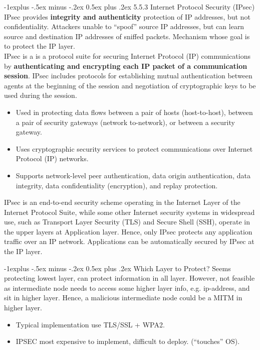 \documentclass[10pt, landscape]{article}
\makeatletter
\renewcommand{\subsection}{\@startsection{subsection}{2}{0mm}%
                                {-1explus -.5ex minus -.2ex}%
                                {0.5ex plus .2ex}%
                                {\normalfont\normalsize\bfseries}}
\makeatother
\begin{document}
\begin{multicols*}{3}
\subsection{5.5.3 Internet Protocol Security (IPsec)}
IPsec provides \textbf{integrity and authenticity} protection of IP addresses, but not confidentiality. Attackers unable to “spoof” source IP 
addresses, but can learn source and destination IP addresses of sniffed packets. Mechanism whose goal is to protect the IP layer. \\ \smallskip
IPsec is a is a protocol suite for securing Internet Protocol (IP) communications by \textbf{authenticating and encrypting each IP packet of a communication session}. IPsec includes protocols for establishing mutual authentication between agents at the beginning of the session and negotiation of cryptographic keys to be used during the session. 

\begin{itemize}
\item Used in protecting data flows between a pair of hosts (host-to-host), between a pair of security gateways (network to-network), or between a security gateway.
\item Uses cryptographic security services to protect communications over Internet Protocol (IP) networks.
\item Supports network-level peer authentication, data origin authentication, data integrity, data confidentiality (encryption), and 
replay protection. 
\end{itemize}
IPsec is an end-to-end security scheme operating in the Internet Layer of the Internet Protocol Suite, while some other Internet security systems in widespread use, such as Transport Layer Security (TLS) and Secure Shell (SSH), operate in the upper layers at
Application layer. Hence, only IPsec protects any application traffic over an IP network. Applications can be automatically secured by IPsec at the IP layer.

\subsection{Which Layer to Protect?}
Seems protecting lowest layer, can protect information in all layer. However, not feasible as intermediate node needs to access some higher layer info, e.g. ip-address, and sit in higher layer. Hence, a malicious intermediate node could be a MITM in higher layer.
\begin{itemize}
\item Typical implementation use TLS/SSL + WPA2.
\item IPSEC most expensive to implement, difficult to deploy. (“touches” OS).
\end{itemize}



\end{multicols*}
\end{document}
